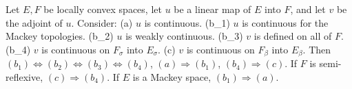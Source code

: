 Let $E, F$ be locally convex spaces, let $u$ be a linear map of $E$ into $F$, and let $v$ be the adjoint of $u$. Consider: (a) $u$ is continuous. (b_1) $u$ is continuous for the Mackey topologies. (b_2) $u$ is weakly continuous. (b_3) $v$ is defined on all of $F$. (b_4) $v$ is continuous on $F_\sigma$ into $E_\sigma$. (c) $v$ is continuous on $F_\beta$ into $E_\beta$. Then $(b_1) \Leftrightarrow (b_2) \Leftrightarrow (b_3) \Leftrightarrow (b_4)$, $(a) \Rightarrow (b_1)$, $(b_4) \Rightarrow (c)$. If $F$ is semi-reflexive, $(c) \Rightarrow (b_4)$. If $E$ is a Mackey space, $(b_1) \Rightarrow (a)$.